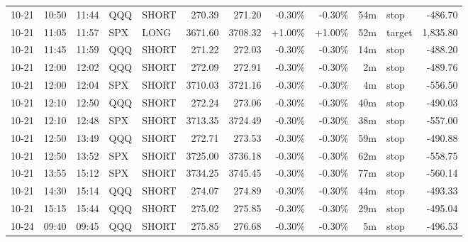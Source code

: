 \documentclass[11pt,a4paper]{article}
\begin{document}
\begin{center}
\begin{longtable}{>{\color{txtmain}}l l l l l r r r r r >{\color{txtmain}}l r}
10-21 & 10:50 & 11:44 & QQQ & SHORT & 270.39 & 271.20 & \textcolor{lossred}{-0.30\%} & \textcolor{lossred}{-0.30\%} & 54m & stop & \textcolor{lossred}{-486.70} \\
10-21 & 11:05 & 11:57 & SPX & LONG & 3671.60 & 3708.32 & \textcolor{wingreen}{+1.00\%} & \textcolor{wingreen}{+1.00\%} & 52m & target & \textcolor{wingreen}{1,835.80} \\
10-21 & 11:45 & 11:59 & QQQ & SHORT & 271.22 & 272.03 & \textcolor{lossred}{-0.30\%} & \textcolor{lossred}{-0.30\%} & 14m & stop & \textcolor{lossred}{-488.20} \\
10-21 & 12:00 & 12:02 & QQQ & SHORT & 272.09 & 272.91 & \textcolor{lossred}{-0.30\%} & \textcolor{lossred}{-0.30\%} & 2m & stop & \textcolor{lossred}{-489.76} \\
10-21 & 12:00 & 12:04 & SPX & SHORT & 3710.03 & 3721.16 & \textcolor{lossred}{-0.30\%} & \textcolor{lossred}{-0.30\%} & 4m & stop & \textcolor{lossred}{-556.50} \\
10-21 & 12:10 & 12:50 & QQQ & SHORT & 272.24 & 273.06 & \textcolor{lossred}{-0.30\%} & \textcolor{lossred}{-0.30\%} & 40m & stop & \textcolor{lossred}{-490.03} \\
10-21 & 12:10 & 12:48 & SPX & SHORT & 3713.35 & 3724.49 & \textcolor{lossred}{-0.30\%} & \textcolor{lossred}{-0.30\%} & 38m & stop & \textcolor{lossred}{-557.00} \\
10-21 & 12:50 & 13:49 & QQQ & SHORT & 272.71 & 273.53 & \textcolor{lossred}{-0.30\%} & \textcolor{lossred}{-0.30\%} & 59m & stop & \textcolor{lossred}{-490.88} \\
10-21 & 12:50 & 13:52 & SPX & SHORT & 3725.00 & 3736.18 & \textcolor{lossred}{-0.30\%} & \textcolor{lossred}{-0.30\%} & 62m & stop & \textcolor{lossred}{-558.75} \\
10-21 & 13:55 & 15:12 & SPX & SHORT & 3734.25 & 3745.45 & \textcolor{lossred}{-0.30\%} & \textcolor{lossred}{-0.30\%} & 77m & stop & \textcolor{lossred}{-560.14} \\
10-21 & 14:30 & 15:14 & QQQ & SHORT & 274.07 & 274.89 & \textcolor{lossred}{-0.30\%} & \textcolor{lossred}{-0.30\%} & 44m & stop & \textcolor{lossred}{-493.33} \\
10-21 & 15:15 & 15:44 & QQQ & SHORT & 275.02 & 275.85 & \textcolor{lossred}{-0.30\%} & \textcolor{lossred}{-0.30\%} & 29m & stop & \textcolor{lossred}{-495.04} \\
10-24 & 09:40 & 09:45 & QQQ & SHORT & 275.85 & 276.68 & \textcolor{lossred}{-0.30\%} & \textcolor{lossred}{-0.30\%} & 5m & stop & \textcolor{lossred}{-496.53} \\

\end{longtable}
\end{center}
\end{document}
